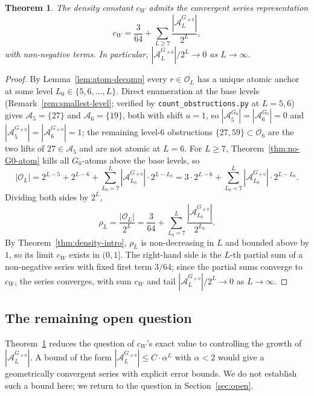\documentclass[11pt,reqno]{amsart}
\theoremstyle{plain}
\newtheorem{theorem}{Theorem}[section]
\theoremstyle{definition}
\theoremstyle{remark}
\newcommand{\Obs}{\mathcal{O}}
\newcommand{\Atom}{\mathcal{A}}
\begin{document}
\begin{theorem}\label{thm:series}
The density constant $c_W$ admits the convergent series representation
\[
c_W = \frac{3}{64} + \sum_{L \ge 7} \frac{|\Atom_L^{G_{\ne 0}}|}{2^L},
\]
with non-negative terms. In particular, $|\Atom_L^{G_{\ne 0}}|/2^L \to 0$ as
$L \to \infty$.
\end{theorem}

\begin{proof}
By Lemma~\ref{lem:atom-decomp} every $r \in \Obs_L$ has a unique atomic
anchor at some level $L_0 \in \{5, 6, \ldots, L\}$. Direct enumeration
at the base levels (Remark~\ref{rem:smallest-level}; verified by
\texttt{count\_obstructions.py} at $L = 5, 6$) gives
$\Atom_5 = \{27\}$ and $\Atom_6 = \{19\}$, both with shift $a = 1$, so
$|\Atom_5^{G_0}| = |\Atom_6^{G_0}| = 0$ and
$|\Atom_5^{G_{\ne 0}}| = |\Atom_6^{G_{\ne 0}}| = 1$; the remaining
level-$6$ obstructions $\{27, 59\} \subset \Obs_6$ are the two lifts of
$27 \in \Atom_5$ and are not atomic at $L = 6$. For $L \ge 7$,
Theorem~\ref{thm:no-G0-atom} kills all $G_0$-atoms above the base
levels, so
\[
|\Obs_L| = 2^{L-5} + 2^{L-6} + \sum_{L_0 = 7}^{L} |\Atom_{L_0}^{G_{\ne 0}}| \cdot 2^{L - L_0}
        = 3 \cdot 2^{L-6} + \sum_{L_0 = 7}^{L} |\Atom_{L_0}^{G_{\ne 0}}| \cdot 2^{L - L_0}.
\]
Dividing both sides by $2^L$,
\[
\rho_L = \frac{|\Obs_L|}{2^L} = \frac{3}{64} + \sum_{L_0 = 7}^{L} \frac{|\Atom_{L_0}^{G_{\ne 0}}|}{2^{L_0}}.
\]
By Theorem~\ref{thm:density-intro}, $\rho_L$ is non-decreasing in $L$ and
bounded above by $1$, so its limit $c_W$ exists in $(0, 1]$. The
right-hand side is the $L$-th partial sum of a non-negative series with
fixed first term $3/64$; since the partial sums converge to $c_W$, the
series converges, with sum $c_W$ and tail $|\Atom_L^{G_{\ne 0}}|/2^L \to 0$
as $L \to \infty$. \qedhere
\end{proof}

\subsection{The remaining open question}

Theorem~\ref{thm:series} reduces the question of $c_W$'s exact value to
controlling the growth of $|\Atom_L^{G_{\ne 0}}|$. A bound of the form
$|\Atom_L^{G_{\ne 0}}| \le C \cdot \alpha^L$ with $\alpha < 2$ would give a
geometrically convergent series with explicit error bounds. We do not
establish such a bound here; we return to the question in
Section~\ref{sec:open}.

\end{document}
